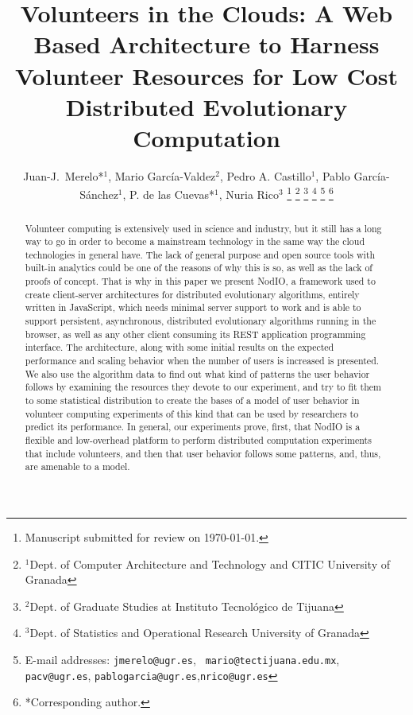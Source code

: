 \documentclass[journal,onecolumn]{IEEEtran}
\begin{document}
\title{Volunteers in the Clouds: A Web Based Architecture to Harness Volunteer Resources 
for Low Cost Distributed Evolutionary Computation }



\author{Juan-J.~Merelo*$^1$, Mario Garc\'ia-Valdez$^2$, Pedro A. Castillo$^1$, Pablo Garc\'ia-S\'anchez$^1$, P. de las Cuevas*$^1$, Nuria Rico$^3$
\thanks{Manuscript submitted for review on \today.}%
\thanks{$^1$Dept. of Computer Architecture and Technology and CITIC University of Granada}%
\thanks{$^2$Dept. of Graduate Studies at Instituto Tecnol\'ogico de Tijuana}%
\thanks{$^3$Dept. of Statistics and Operational Research University of Granada}%
\thanks{E-mail addresses: {\tt jmerelo@ugr.es}, {\tt
    mario@tectijuana.edu.mx}, {\tt pacv@ugr.es}, {\tt pablogarcia@ugr.es},{\tt nrico@ugr.es}}%
\thanks{*Corresponding author.}%
}

\maketitle

\begin{abstract}
Volunteer computing is extensively used 
in science and industry, but it
still has a long way to go in order to become
 a mainstream
technology in the same way the cloud technologies in general have. The
lack of 
general purpose and open source tools with built-in analytics 
could be one of the reasons of why this is so, as well as the lack of
proofs of concept. That is why in this paper we present {\sf NodIO}, a
framework used to create client-server architectures for distributed
evolutionary algorithms, entirely written  
in JavaScript, which needs
minimal server support to work and is able to support persistent,
asynchronous, distributed evolutionary algorithms running in the
browser, as well as any other client consuming its REST application
programming interface.  The architecture, along with some initial
results on the expected performance and scaling behavior when the
number of users is increased is presented. We also use
the algorithm data to find out what kind of patterns the user behavior
follows by examining the resources they devote to our experiment, and
try to fit them to some statistical distribution to create the bases
of a model of user behavior in volunteer computing experiments of this
kind that can be used by researchers to predict its performance. 
In general, our experiments prove, first, that {\sf NodIO} is a flexible and
low-overhead platform to perform distributed computation experiments
that include volunteers, and then that user behavior follows some patterns,
and, thus, are amenable to a model.
\end{abstract}
\end{document}
